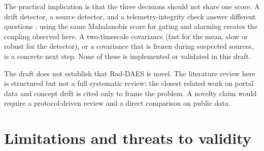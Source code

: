 \documentclass[11pt]{article}
\begin{document}
The practical implication is that the three decisions should not share one score. A drift detector, a source detector, and a telemetry-integrity check answer different questions \citep{gama2014survey,isermann2005model}; using the same Mahalanobis score for gating and alarming creates the coupling observed here. A two-timescale covariance (fast for the mean, slow or robust for the detector), or a covariance that is frozen during suspected sources, is a concrete next step. None of these is implemented or validated in this draft.

The draft does not establish that Rad-DAES is novel. The literature review here is structured but not a full systematic review; the closest related work on portal data and concept drift is cited only to frame the problem. A novelty claim would require a protocol-driven review and a direct comparison on public data.

\section{Limitations and threats to validity}
\end{document}
